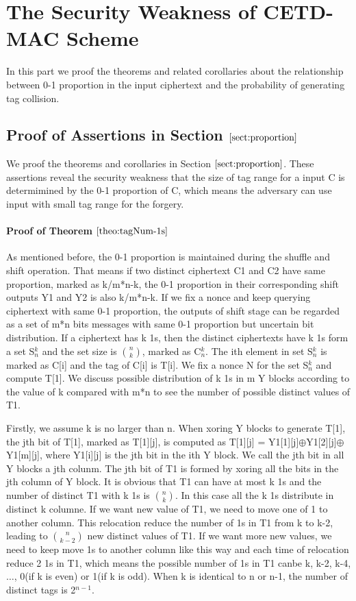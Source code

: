 \documentclass{article}
\begin{document}


\appendix
\section{The Security Weakness of CETD-MAC Scheme}
In this part we proof the theorems and related corollaries about the relationship between 0-1 proportion in the input ciphertext and the probability of generating tag collision.
\subsection{Proof of Assertions in Section $\ref{sect:proportion}$}
We proof the theorems and corollaries in Section $\ref{sect:proportion}$. These assertions reveal the security weakness that the size of tag range for a input C is determimined by the 0-1 proportion of C, which means the adversary can use input with small tag range for the forgery. 
\paragraph{Proof of Theorem $\ref{theo:tagNum-1s}$}
As mentioned before, the 0-1 proportion is maintained during the shuffle and shift operation. That means if two distinct ciphertext C1 and C2 have same proportion, marked as k/m*n-k, the 0-1 proportion in their corresponding shift outputs Y1 and Y2 is also k/m*n-k.  
If we fix a nonce and keep querying ciphertext with same 0-1 proportion, the outputs of shift stage can be regarded as a set of m*n bits messages with same 0-1 proportion but uncertain bit distribution. If a ciphertext has k 1s, then the distinct ciphertexts have k 1s form a set S$_{n}^{k}$ and the set size is $\binom{n}{k}$, marked as C$_{n}^{k}$. The ith element in set S$_{n}^{k}$ is marked as C[i] and the tag of C[i] is T[i].   
We fix a nonce N for the set S$_{n}^{k}$ and compute T[1]. We discuss possible distribution of k 1s in m Y blocks according to the value of k compared with m*n to see the number of possible distinct values of T1. 

Firstly, we assume k is no larger than n. When xoring Y blocks to generate T[1], the jth bit of T[1], marked as T[1][j], is computed as T[1][j] = Y1[1][j]$\oplus$Y1[2][j]$\oplus$Y1[m][j], where Y1[i][j] is the jth bit in the ith Y block. We call the jth bit in all Y blocks a jth colunm. The jth bit of T1 is formed by xoring all the bits in the jth column of Y block.  It is obvious that T1 can have at most k 1s and the number of distinct T1 with k 1s is $\binom{n}{k}$. In this case all the k 1s distribute in distinct k columne.  If we want new value of T1, we need to move one of 1 to another column. This relocation reduce the number of 1s in T1 from k to k-2, leading to $\binom{n}{k-2}$ new distinct values of T1. If we want more new values, we need to keep move 1s to another column like this way and each time of relocation reduce 2 1s in T1, which means the possible number of 1s in T1 canbe k, k-2, k-4,$\ldots$, 0(if k is even) or 1(if k is odd). 
When k is identical to n or n-1, the number of distinct tags is 2$^{n-1}$.  
\end{document}
